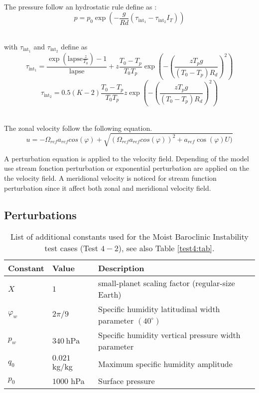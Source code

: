 \documentclass[times,doublespace]{fldauth}
\begin{document}
~\\ The pressure follow an hydrostatic rule define as :
\begin{equation}
p=p_0\exp(-\frac{g}{Rd}(\tau_{\text{int}_1}-\tau_{\text{int}_2}I_T))
\end{equation}

~\\with $\tau_{\text{int}_1}$ and $\tau_{\text{int}_2}$ define as
\begin{equation*}
\tau_{\text{int}_1}=\frac{\exp\left( \text{lapse}\frac{z}{T_0} \right)-1}{\text{lapse}}+z\frac{T_0-T_p}{T_0T_p}\exp\left(-\left(\frac{zT_pg}{(T_0-T_p)R_d}\right)^2\right)
\end{equation*}
\begin{equation*}
\tau_{\text{int}_2}=0.5(K-2)\frac{T_0-T_p}{T_0T_p}z\exp\left(-\left(\frac{zT_pg}{(T_0-T_p)R_d}\right)^2\right)
\end{equation*}

\clearpage


~\\ The zonal velocity follow the following equation.  
\begin{equation}
 u=-\Omega_{ref} a_{ref} cos(\varphi)+\sqrt{(\Omega_{ref} a_{ref} cos(\varphi))^2+ a_{ref} \cos(\varphi)U)}
\end{equation}

A perturbation equation is applied to the velocity field. Depending of the model use stream fonction perturbation or exponential perturbation are applied on the the velocity field. A meridional velocity is noticed for stream function perturbation since it affect both zonal and meridional velocity field.





 
\subsection{Perturbations}

\begin{table}[h]

\caption{List of additional constants used for the Moist Baroclinic Instability test cases (Test $4-2$), see also Table \ref{test4:tab}.}
\label{test42:tab}
\begin{tabular*}{\textwidth}{@{\extracolsep{\fill}}lll}
\hline Constant & Value & Description \\
\hline 
$X$ & $1$ & small-planet scaling factor (regular-size Earth)\\
$\varphi_w$ & $2 \pi / 9$ & Specific humidity latitudinal width parameter $(40^\circ)$\\
$p_w$ & $340\ \mbox{hPa}$ & Specific humidity vertical pressure width parameter \\
$q_0$ & $0.021$ kg/kg& Maximum specific humidity amplitude \\
$p_0$ & $1000$ hPa& Surface pressure \\
\hline 
\end{tabular*}

\end{table}
\end{document}
